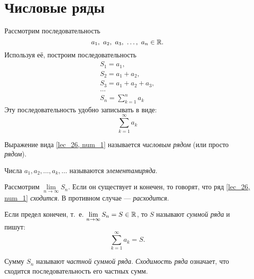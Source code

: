 \documentclass[../../main.tex]{subfiles}
\begin{document}
\section{Числовые ряды}
Рассмотрим последовательность
\[a_1,\  a_2,\  a_3,\  \ldots,\  a_n \in \mathbb{R}.\]
Используя её, построим последовательность
\[
\begin{array}{l}
		S_1 = a_1, \\
		S_2 = a_1 + a_2,\\
		S_3 = a_1 + a_2 + a_3,\\
		\dots\\
		S_n = \sum\limits_{k = 1}^na_k
\end{array}		
\]
Эту последовательность удобно записывать в виде:
\begin{equation}
	\label{lec_26, num_1}
	 \sum\limits_{k = 1}^\infty a_k
\end{equation}
\begin{definition}
Выражение вида \eqref{lec_26, num_1} называется
\emph{числовым рядом} (или просто \emph{рядом}).
\end{definition}
Числа  $a_1, a_2,  \ldots, a_k,  \ldots$ 
называются \emph{элементами ряда}.

Рассмотрим $\lim\limits_{n \to \infty} S_n$. Если он существует 
и конечен, то говорят, 
что ряд \eqref{lec_26, num_1}  \emph{сходится}. 
В противном случае ---\emph{ расходится}.
\begin{definition}
Если предел конечен, т.~е. $\lim\limits_{n \to \infty} S_n = S \in \mathbb{R}$, то $S$ 
называют \emph{суммой ряда} и пишут:
\[
	\sum\limits_{k = 1}^\infty a_k=S
.\]
\end{definition}
Сумму $S_n$ называют \emph{частной суммой ряда}. 
\emph{Сходимость ряда} означает,
что сходится последовательность его частных сумм.
\end{document}
